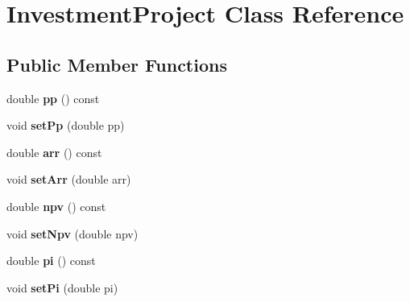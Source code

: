 \hypertarget{class_investment_project}{}\section{Investment\+Project Class Reference}
\label{class_investment_project}
\subsection*{Public Member Functions}
\begin{DoxyCompactItemize}
\item 
\hypertarget{class_investment_project_ac2fc7dc54f28f97590f04d174b5ab3df}{}double {\bfseries pp} () const \label{class_investment_project_ac2fc7dc54f28f97590f04d174b5ab3df}

\item 
\hypertarget{class_investment_project_a8fb4ef63dd82fdb41c26fd879009ba70}{}void {\bfseries set\+Pp} (double pp)\label{class_investment_project_a8fb4ef63dd82fdb41c26fd879009ba70}

\item 
\hypertarget{class_investment_project_a9ea5a010e77ec8e47d41da8186dc583d}{}double {\bfseries arr} () const \label{class_investment_project_a9ea5a010e77ec8e47d41da8186dc583d}

\item 
\hypertarget{class_investment_project_a6ef86a53f9d55bbf69662447cea9bc2a}{}void {\bfseries set\+Arr} (double arr)\label{class_investment_project_a6ef86a53f9d55bbf69662447cea9bc2a}

\item 
\hypertarget{class_investment_project_a1db1b6a2e4ca57da82c377f867704d55}{}double {\bfseries npv} () const \label{class_investment_project_a1db1b6a2e4ca57da82c377f867704d55}

\item 
\hypertarget{class_investment_project_a2f7dc7cca09561bb5d4f465b151d93a1}{}void {\bfseries set\+Npv} (double npv)\label{class_investment_project_a2f7dc7cca09561bb5d4f465b151d93a1}

\item 
\hypertarget{class_investment_project_aa640e0d9a63b68c2f2bfdc3a55dbf016}{}double {\bfseries pi} () const \label{class_investment_project_aa640e0d9a63b68c2f2bfdc3a55dbf016}

\item 
\hypertarget{class_investment_project_a8d3f14602ba3be79a8b2adb73bee22d9}{}void {\bfseries set\+Pi} (double pi)\label{class_investment_project_a8d3f14602ba3be79a8b2adb73bee22d9}


\end{DoxyCompactItemize}
